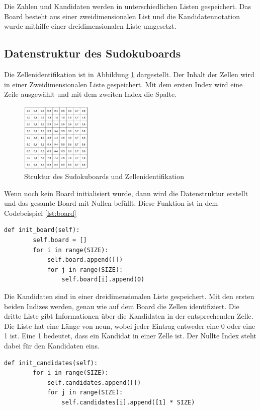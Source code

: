Die Zahlen und Kandidaten werden in unterschiedlichen Listen gespeichert. Das Board besteht aus einer zweidimensionalen List und die Kandidatennotation wurde mithilfe einer dreidimensionalen Liste umgesetzt. 

\subsection{Datenstruktur des Sudokuboards}
Die Zellenidentifikation ist in Abbildung \ref{fig:Sudokugitter} dargestellt. Der Inhalt der Zellen wird in einer Zweidimensionalen Liste gespeichert. Mit dem ersten Index wird eine Zeile ausgewählt und mit dem zweiten Index die Spalte. 

\begin{figure}[htbp]
	\centering
	\includegraphics[width=0.3\textwidth]{images/board.png}
	\caption{Struktur des Sudokuboards und Zellenidentifikation \cite{zambon2015sudoku}}
	\label{fig:Sudokugitter}
\end{figure}

Wenn noch kein Board initialisiert wurde, dann wird die Datenstruktur erstellt und das gesamte Board mit Nullen befüllt. Diese Funktion ist in dem Codebeispiel \ref{lst:board} 

\begin{lstlisting}[caption={Initalisierung des Boards}, label={lst:board}]
	def init_board(self):
		self.board = []
		for i in range(SIZE):
			self.board.append([])
			for j in range(SIZE):
				self.board[i].append(0)
\end{lstlisting}

Die Kandidaten sind in einer dreidimensionalen Liste gespeichert. Mit den ersten beiden Indizes werden, genau wie auf dem Board die Zellen identifiziert. Die dritte Liste gibt Informationen über die Kandidaten in der entsprechenden Zelle. Die Liste hat eine Länge von neun, wobei jeder Eintrag entweder eine 0 oder eine 1 ist. Eine 1 bedeutet, dass ein Kandidat in einer Zelle ist. Der Nullte Index steht dabei für den Kandidaten eins.

\begin{lstlisting}[caption={Initalisierung der Kandidaten}, label={lst:candidates}]
	def init_candidates(self):
		for i in range(SIZE):
			self.candidates.append([])
			for j in range(SIZE):
				self.candidates[i].append([1] * SIZE)
\end{lstlisting}

